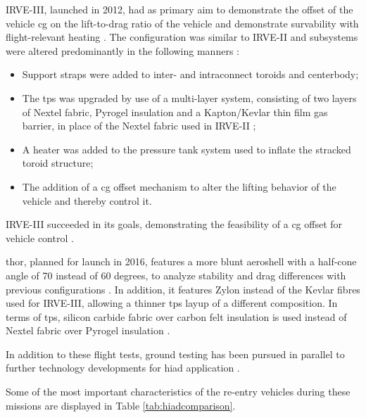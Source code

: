 IRVE-III, launched in 2012, had as primary aim to demonstrate the offset of the vehicle \gls{cg} on the lift-to-drag ratio of the vehicle and demonstrate survability with flight-relevant heating \cite{Dillman2012a}. The configuration was similar to IRVE-II and subsystems were altered predominantly in the following  manners \cite{Dillman2012a}:
\begin{itemize}
\item Support straps were added to inter- and intraconnect toroids and centerbody;
\item The \gls{tps} was upgraded by use of a multi-layer system, consisting of two layers of Nextel fabric, Pyrogel insulation and a Kapton/Kevlar thin film gas barrier, in place of the Nextel fabric used in IRVE-II \cite{Dillman2012}; 
\item A heater was added to the pressure tank system used to inflate the stracked toroid structure;
\item The addition of a \gls{cg} offset mechanism to alter the lifting behavior of the vehicle and thereby control it.
\end{itemize}
IRVE-III succeeded in its goals, demonstrating the feasibility of a \gls{cg} offset for vehicle control \cite{Dillman2012}.

\gls{thor}, planned for launch in 2016, features a more blunt aeroshell with a half-cone angle of 70 instead of 60 degrees, to analyze stability and drag differences with previous configurations \cite{Hughes2005, Dillman2010, Dillman2012, Dillman2014}. In addition, it features Zylon instead of the Kevlar fibres used for IRVE-III, allowing a thinner \gls{tps} layup of a different composition. In terms of \gls{tps}, silicon carbide fabric over carbon felt insulation is used instead of Nextel fabric over Pyrogel insulation \cite{Dillman2014}.

In addition to these flight tests, ground testing has been pursued in parallel to further technology developments for \gls{hiad} application \cite{Smith2010}.

Some of the most important characteristics of the re-entry vehicles during these missions are displayed in Table \ref{tab:hiadcomparison}.

